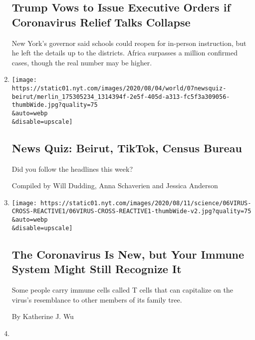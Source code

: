 \begin{enumerate}
  \hypertarget{trump-vows-to-issue-executive-orders-if-coronavirus-relief-talks-collapse}{%
  \subsection{Trump Vows to Issue Executive Orders if Coronavirus Relief
  Talks
  Collapse}\label{trump-vows-to-issue-executive-orders-if-coronavirus-relief-talks-collapse}}

  New York's governor said schools could reopen for in-person
  instruction, but he left the details up to the districts. Africa
  surpasses a million confirmed cases, though the real number may be
  higher.
\item
  \href{/interactive/2020/08/07/briefing/beirut-tiktok-census-bureau-news-quiz.html}{}

  \texttt{[image: https://static01.nyt.com/images/2020/08/04/world/07newsquiz-beirut/merlin\_175305234\_1314394f-2e5f-405d-a313-fc5f3a309056-thumbWide.jpg?quality=75\\\&auto=webp\\\&disable=upscale]}

  \hypertarget{news-quiz-beirut-tiktok-census-bureau}{%
  \subsection{News Quiz: Beirut, TikTok, Census
  Bureau}\label{news-quiz-beirut-tiktok-census-bureau}}

  Did you follow the headlines this week?

  Compiled by Will Dudding, Anna Schaverien and Jessica Anderson
\item
  \href{/2020/08/06/health/coronavirus-immune-cells.html}{}

  \texttt{[image: https://static01.nyt.com/images/2020/08/11/science/06VIRUS-CROSS-REACTIVE1/06VIRUS-CROSS-REACTIVE1-thumbWide-v2.jpg?quality=75\\\&auto=webp\\\&disable=upscale]}

  \hypertarget{the-coronavirus-is-new-but-your-immune-system-might-still-recognize-it}{%
  \subsection{The Coronavirus Is New, but Your Immune System Might Still
  Recognize
  It}\label{the-coronavirus-is-new-but-your-immune-system-might-still-recognize-it}}

  Some people carry immune cells called T cells that can capitalize on
  the virus's resemblance to other members of its family tree.

  By Katherine J. Wu
\item
  \href{/2020/08/06/climate/hurricanes-noaa-prediction.html}{}


\end{enumerate}
